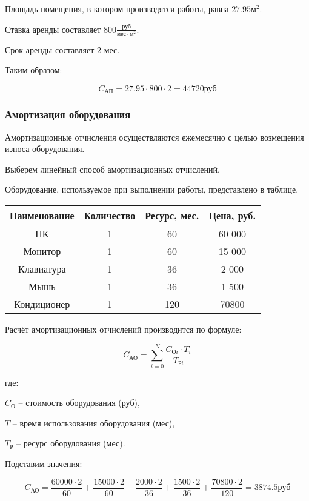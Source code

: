Площадь помещения, в котором производятся работы, равна $27.95 \text{м}^2$.

Ставка аренды составляет $800 \frac{\text{руб}}{\text{мес}\cdot\text{м}^2}$.

Срок аренды составляет 2 мес.

Таким образом:

$$ C_\text{АП} = 27.95 \cdot 800 \cdot 2 = 44720\text{руб} $$

\subsubsection{Амортизация оборудования}

Амортизационные отчисления осуществляются ежемесячно с целью
возмещения износа оборудования.

Выберем линейный способ амортизационных отчислений.

Оборудование, используемое при выполнении работы, представлено в таблице.

\vspace{1em}

\begin{tabular}{|c|c|c|c|}
\hline
Наименование & Количество & Ресурс, мес. & Цена, руб. \\
\hline
ПК & 1 & 60 & 60 000 \\
\hline
Монитор & 1 & 60 & 15 000 \\
\hline
Клавиатура & 1 & 36 & 2 000 \\
\hline
Мышь & 1 & 36 & 1 500 \\
\hline
Кондиционер & 1 & 120 & 70800 \\
\hline
\end{tabular}

\vspace{1em}

Расчёт амортизационных отчислений производится по формуле:

$$ C_\text{АО} = \sum_{i=0}^{N} \frac{C_{\text{О}i} \cdot T_i}{T_{\text{Р}i}} $$

где:

$C_\text{О}$ -- стоимость оборудования (руб),

$T$ -- время использования оборудования (мес),

$T_\text{Р}$ -- ресурс оборудования (мес).

Подставим значения:

$$ C_\text{АО} = \frac{60000 \cdot 2}{60} + \frac{15000 \cdot 2}{60}
+ \frac{2000 \cdot 2}{36} + \frac{1500 \cdot 2}{36} +
\frac{70800 \cdot 2}{120} = 3874.5 \text{руб} $$

